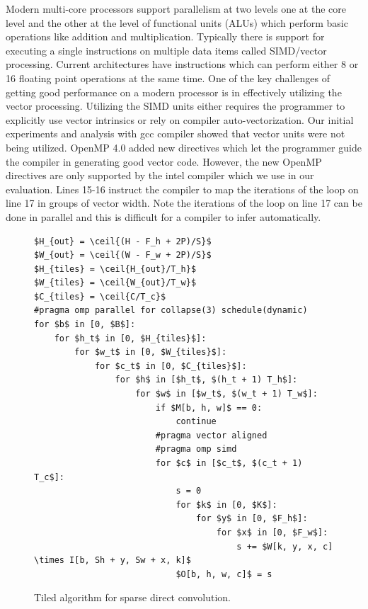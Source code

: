 \documentclass{article}
\begin{document}
Modern multi-core processors support parallelism at two levels one at the core
level and the other at the level of functional units (ALUs) which perform basic
operations like addition and multiplication. Typically there is support for
executing a single instructions on multiple data items called SIMD/vector
processing.  Current architectures have instructions which can perform either 8
or 16 floating point operations at the same time. One of the key challenges of
getting good performance on a modern processor is in effectively utilizing the
vector processing. Utilizing the SIMD units either requires the programmer to
explicitly use vector intrinsics or rely on compiler auto-vectorization. Our
initial experiments and analysis with gcc compiler showed that vector units were
not being utilized. OpenMP 4.0 added new directives which let the programmer
guide the compiler in generating good vector code. However, the new OpenMP
directives are only supported by the intel compiler which we use in our
evaluation. Lines 15-16 instruct the compiler to map the iterations of the loop
on line 17 in groups of vector width. Note the iterations of the loop on line 17
can be done in parallel and this is difficult for a compiler to infer
automatically.

\begin{figure}
\begin{lstlisting}[mathescape]
$H_{out} = \ceil{(H - F_h + 2P)/S}$
$W_{out} = \ceil{(W - F_w + 2P)/S}$
$H_{tiles} = \ceil{H_{out}/T_h}$
$W_{tiles} = \ceil{W_{out}/T_w}$
$C_{tiles} = \ceil{C/T_c}$
#pragma omp parallel for collapse(3) schedule(dynamic)
for $b$ in [0, $B$]:
    for $h_t$ in [0, $H_{tiles}$]:
        for $w_t$ in [0, $W_{tiles}$]:
            for $c_t$ in [0, $C_{tiles}$]:
                for $h$ in [$h_t$, $(h_t + 1) T_h$]:
                    for $w$ in [$w_t$, $(w_t + 1) T_w$]:
                        if $M[b, h, w]$ == 0:
                            continue
                        #pragma vector aligned
                        #pragma omp simd
                        for $c$ in [$c_t$, $(c_t + 1) T_c$]:
                            s = 0
                            for $k$ in [0, $K$]:
                                for $y$ in [0, $F_h$]:
                                    for $x$ in [0, $F_w$]:
                                        s += $W[k, y, x, c] \times I[b, Sh + y, Sw + x, k]$
                            $O[b, h, w, c]$ = s

\end{lstlisting}
    \caption{Tiled algorithm for sparse direct convolution.}
    \label{fig:conv_algo}
\end{figure}
\end{document}
